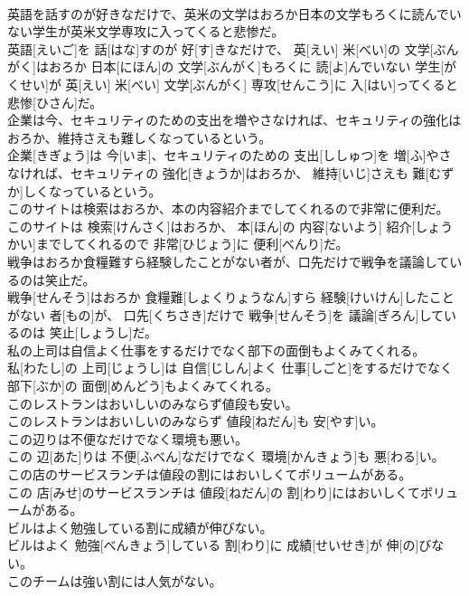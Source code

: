 \documentclass[8pt]{extreport}
\begin{document}
\begin{CJK}{UTF8}{min}
\\	英語を話すのが好きなだけで、英米の文学はおろか日本の文学もろくに読んでいない学生が英米文学専攻に入ってくると悲惨だ。	
\\	英語[えいご]を 話[はな]すのが 好[す]きなだけで、 英[えい] 米[べい]の 文学[ぶんがく]はおろか 日本[にほん]の 文学[ぶんがく]もろくに 読[よ]んでいない 学生[がくせい]が 英[えい] 米[べい] 文学[ぶんがく] 専攻[せんこう]に 入[はい]ってくると 悲惨[ひさん]だ。
\\	企業は今、セキュリティのための支出を増やさなければ、セキュリティの強化はおろか、維持さえも難しくなっているという。	
\\	企業[きぎょう]は 今[いま]、セキュリティのための 支出[ししゅつ]を 増[ふ]やさなければ、セキュリティの 強化[きょうか]はおろか、 維持[いじ]さえも 難[むずか]しくなっているという。
\\	このサイトは検索はおろか、本の内容紹介までしてくれるので非常に便利だ。	
\\	このサイトは 検索[けんさく]はおろか、 本[ほん]の 内容[ないよう] 紹介[しょうかい]までしてくれるので 非常[ひじょう]に 便利[べんり]だ。
\\	戦争はおろか食糧難すら経験したことがない者が、口先だけで戦争を議論しているのは笑止だ。	
\\	戦争[せんそう]はおろか 食糧難[しょくりょうなん]すら 経験[けいけん]したことがない 者[もの]が、 口先[くちさき]だけで 戦争[せんそう]を 議論[ぎろん]しているのは 笑止[しょうし]だ。
\\	私の上司は自信よく仕事をするだけでなく部下の面倒もよくみてくれる。	
\\	私[わたし]の 上司[じょうし]は 自信[じしん]よく 仕事[しごと]をするだけでなく 部下[ぶか]の 面倒[めんどう]もよくみてくれる。
\\	このレストランはおいしいのみならず値段も安い。	
\\	このレストランはおいしいのみならず 値段[ねだん]も 安[やす]い。
\\	この辺りは不便なだけでなく環境も悪い。	
\\	この 辺[あた]りは 不便[ふべん]なだけでなく 環境[かんきょう]も 悪[わる]い。
\\	この店のサービスランチは値段の割にはおいしくてボリュームがある。	
\\	この 店[みせ]のサービスランチは 値段[ねだん]の 割[わり]にはおいしくてボリュームがある。
\\	ビルはよく勉強している割に成績が伸びない。	
\\	ビルはよく 勉強[べんきょう]している 割[わり]に 成績[せいせき]が 伸[の]びない。
\\	このチームは強い割には人気がない。	

\end{CJK}
\end{document}
